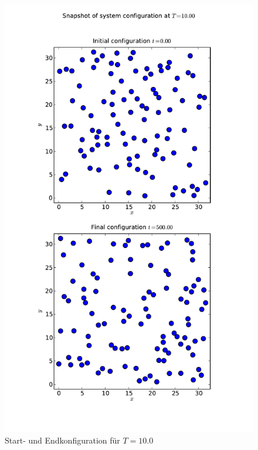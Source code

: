 \documentclass[11pt,a4paper]{article}
\begin{document}
\begin{figure}[tbp]
\centering
\vspace*{-1cm}\includegraphics[width=14cm]{../snapshot_T_10_00}
\vspace*{-1.5cm} \caption{Start- und Endkonfiguration für $T=10.0$}\label{fig:config10}
\end{figure}

\end{document}
